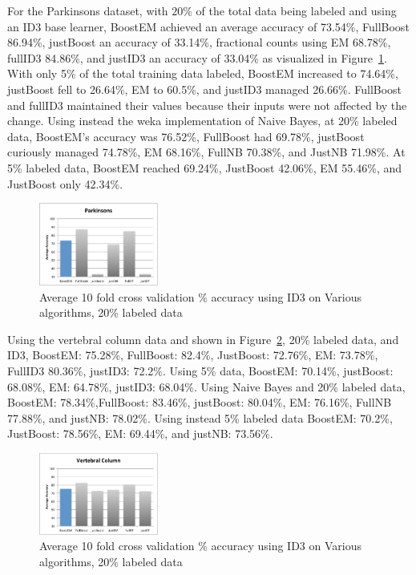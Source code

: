 \documentclass{sig-alternate}
\begin{document}
For the Parkinsons dataset, with $20\%$ of the total data being labeled and using an ID3 base learner, BoostEM achieved an average accuracy of 73.54\%, FullBoost 86.94\%, justBoost an accuracy of 33.14\%, fractional counts using EM 68.78\%, fullID3 84.86\%, and justID3 an accuracy of 33.04\% as visualized in Figure~\ref{parkAcc}. With only 5\% of the total training data labeled, BoostEM increased to 74.64\%, justBoost fell to 26.64\%, EM to 60.5\%, and justID3 managed 26.66\%.  FullBoost and fullID3 maintained their values because their inputs were not affected by the change. Using instead the weka implementation of Naive Bayes, at 20\% labeled data, BoostEM's accuracy was 76.52\%, FullBoost had 69.78\%, justBoost curiously managed 74.78\%, EM 68.16\%, FullNB 70.38\%, and JustNB 71.98\%. At 5\% labeled data, BoostEM reached 69.24\%, JustBoost 42.06\%, EM 55.46\%, and JustBoost only 42.34\%.

\begin{figure}
\centering
\includegraphics[width=0.35\textwidth]{figures/parkAcc.pdf}
\caption{Average 10 fold cross validation \% accuracy using ID3 on Various algorithms, 20\% labeled data}
\label{parkAcc}
\end{figure}

Using the vertebral column data and shown in Figure~\ref{vertAcc}, 20\% labeled data, and ID3, BoostEM: 75.28\%, FullBoost: 82.4\%, JustBoost: 72.76\%, EM: 73.78\%, FullID3 80.36\%, justID3: 72.2\%.  Using 5\% data, BoostEM: 70.14\%, justBoost: 68.08\%, EM: 64.78\%, justID3: 68.04\%. 
Using Naive Bayes and 20\% labeled data, BoostEM: 78.34\%,FullBoost: 83.46\%, justBoost: 80.04\%, EM: 76.16\%, FullNB 77.88\%, and justNB: 78.02\%. Using instead 5\% labeled data BoostEM: 70.2\%, JustBoost: 78.56\%, EM: 69.44\%, and justNB: 73.56\%.

\begin{figure}
\centering
\includegraphics[width=0.35\textwidth]{figures/vertAcc.pdf}
\caption{Average 10 fold cross validation \% accuracy using ID3 on Various algorithms, 20\% labeled data}
\label{vertAcc}
\end{figure}
\end{document}
